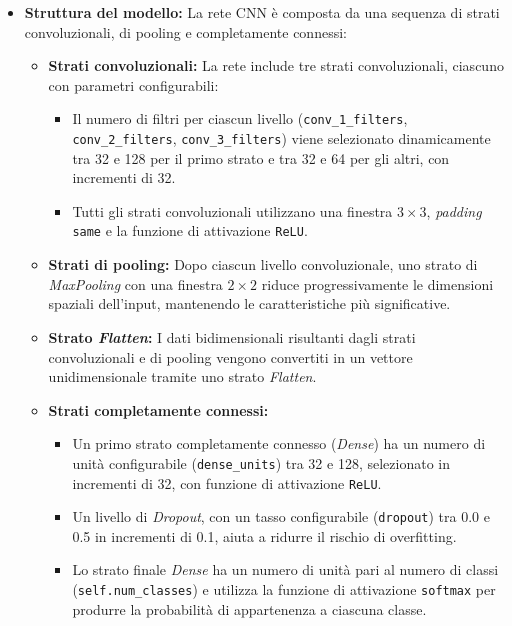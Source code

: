 \begin{itemize}
    \item \textbf{Struttura del modello:} 
    La rete CNN è composta da una sequenza di strati convoluzionali, di pooling e completamente connessi:
    \begin{itemize}
        \item \textbf{Strati convoluzionali:} La rete include tre strati convoluzionali, ciascuno con parametri configurabili:
        \begin{itemize}
            \item Il numero di filtri per ciascun livello (\texttt{conv\_1\_filters}, \texttt{conv\_2\_filters}, \texttt{conv\_3\_filters}) viene selezionato dinamicamente tra 32 e 128 per il primo strato e tra 32 e 64 per gli altri, con incrementi di 32. 
            \item Tutti gli strati convoluzionali utilizzano una finestra \(3 \times 3\), \textit{padding} \texttt{same} e la funzione di attivazione \texttt{ReLU}.
        \end{itemize}
        \item \textbf{Strati di pooling:} Dopo ciascun livello convoluzionale, uno strato di \textit{MaxPooling} con una finestra \(2 \times 2\) riduce progressivamente le dimensioni spaziali dell'input, mantenendo le caratteristiche più significative.
        \item \textbf{Strato \textit{Flatten}:} I dati bidimensionali risultanti dagli strati convoluzionali e di pooling vengono convertiti in un vettore unidimensionale tramite uno strato \textit{Flatten}.
        \item \textbf{Strati completamente connessi:} 
        \begin{itemize}
            \item Un primo strato completamente connesso (\textit{Dense}) ha un numero di unità configurabile (\texttt{dense\_units}) tra 32 e 128, selezionato in incrementi di 32, con funzione di attivazione \texttt{ReLU}.
            \item Un livello di \textit{Dropout}, con un tasso configurabile (\texttt{dropout}) tra 0.0 e 0.5 in incrementi di 0.1, aiuta a ridurre il rischio di overfitting.
            \item Lo strato finale \textit{Dense} ha un numero di unità pari al numero di classi (\texttt{self.num\_classes}) e utilizza la funzione di attivazione \texttt{softmax} per produrre la probabilità di appartenenza a ciascuna classe.
        \end{itemize}
    \end{itemize}


\end{itemize}
